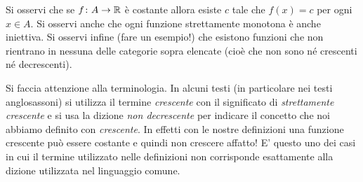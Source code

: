   Si osservi che se $f\colon A \to \mathbb R$ è costante allora esiste $c$ tale che
  $f(x)=c$ per ogni $x\in A$. Si osservi anche che ogni funzione strettamente monotona è anche iniettiva. Si osservi infine (fare un esempio!) che esistono funzioni che non rientrano in nessuna delle categorie sopra elencate (cioè che non sono né crescenti né decrescenti).
  
  Si faccia attenzione alla terminologia.
  In alcuni testi (in particolare nei testi anglosassoni) si utilizza il termine
  \emph{crescente} con il significato di \emph{strettamente crescente} e si usa la dizione \emph{non decrescente} per indicare il concetto che noi abbiamo definito con \emph{crescente}. In
  effetti con le nostre definizioni una funzione crescente può essere costante
  e quindi non crescere affatto!
  E' questo uno dei casi in cui il termine utilizzato nelle definizioni non corrisponde esattamente alla dizione utilizzata
  nel linguaggio comune.
  

